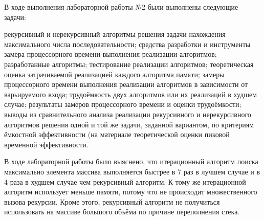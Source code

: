 
В ходе выполнения лабораторной работы №2 были выполнены следующие задачи:
\begin{enumerate}
	 рекурсивный и нерекурсивный алгоритмы решения задачи нахождения максимального числа последовательности;
	 средства разработки и инструменты замера процессорного времени выполнения реализации алгоритмов;
	 разработанные алгоритмы;
	 тестирование реализации алгоритмов;
	 теоретическая оценка затрачиваемой реализацией каждого алгоритма памяти;
	 замеры процессорного времени выполнения реализации алгоритмов в зависимости от варьируемого входа;
	 трудоёмкость двух алгоритмов или их реализаций в худшем случае;
	 результаты замеров процессорного времени и оценки трудоёмкости;
	 выводы из сравнительного анализа реализации рекурсивного и нерекурсивного алгоритмов решения одной и той же задачи, заданной вариантом, по критериям ёмкостной эффективности (на материале теоретической оценки пиковой временной эффективности.
\end{enumerate}

В ходе лабораторной работы было выяснено, что итерационный алгоритм поиска максимально элемента массива выполняется быстрее в 7 раз в лучшем случае и в 4 раза в худшем случае чем рекурсивный алгоритм. К тому же итерационной алгоритм использует меньше памяти, потому что не происходит множественного вызова рекурсии. Кроме этого, рекурсивный алгоритм не получиться использовать на массиве большого объёма по причине переполнения стека.
